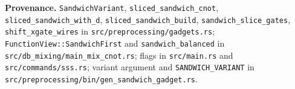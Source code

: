 \documentclass[11pt]{article}
\newcommand{\code}[1]{\texttt{#1}}
\begin{document}
\vspace{4pt}
\noindent\textbf{Provenance.} \code{SandwichVariant}, \code{sliced\_sandwich\_cnot},
\code{sliced\_sandwich\_with\_d}, \code{sliced\_sandwich\_build},
\code{sandwich\_slice\_gates}, \code{shift\_xgate\_wires} in
\code{src/preprocessing/gadgets.rs}; \code{FunctionView::SandwichFirst} and
\code{sandwich\_balanced} in \code{src/db\_mixing/main\_mix\_cnot.rs}; flags in
\code{src/main.rs} and \code{src/commands/sss.rs}; variant argument and
\code{SANDWICH\_VARIANT} in
\code{src/preprocessing/bin/gen\_sandwich\_gadget.rs}.
\end{document}

